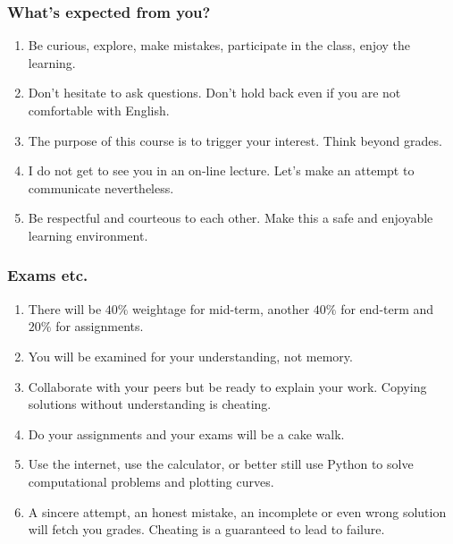 \documentclass{beamer}
\begin{document}
\begin{frame}
\frametitle{What's expected from you?}
\begin{enumerate}
\item Be curious, explore, make mistakes, participate in the class, enjoy the 
learning.
\item Don't hesitate to ask questions. Don't hold back even if you are not 
comfortable with English.
\item The purpose of this course is to trigger your interest. Think beyond
grades.
\item I do not get to see you in an on-line lecture. Let's make an attempt to 
communicate nevertheless.
\item Be respectful and courteous to each other. Make this a safe and enjoyable
learning environment.
\end{enumerate}
\end{frame}

\begin{frame}
\frametitle{Exams etc.}
\begin{enumerate}
\item There will be $40\%$ weightage for mid-term, another $40\%$ for end-term
and $20\%$ for assignments.
\item You will be examined for your understanding, not memory. 
\item Collaborate with your peers but be ready to explain your work. Copying
solutions without understanding is cheating.
\item Do your assignments and your exams will be a cake walk.
\item Use the internet, use the calculator, or better still use Python to solve
computational problems and plotting curves.
\item A sincere attempt, an honest mistake, an incomplete or even wrong solution
will fetch you grades. Cheating is a guaranteed to lead to failure.
\end{enumerate}
\end{frame}
\end{document}
